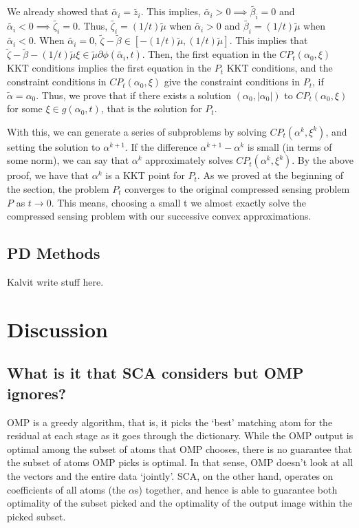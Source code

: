 \documentclass[letterpaper, 10 pt, conference]{article}
\begin{document}
\noindent We already showed that $\tilde{\alpha_i} = \tilde{z_i}$. This implies, $\tilde{\alpha_i} > 0 \implies \tilde{\beta_i} = 0$ and $\tilde{\alpha_i} < 0 \implies \tilde{\zeta_i} = 0$. Thus, $\tilde{\zeta_i} = (1/t)\tilde{\mu}$ when $\tilde{\alpha_i} > 0$ and $\tilde{\beta_i} = (1/t)\tilde{\mu}$ when $\tilde{\alpha_i} < 0$. When $\tilde{\alpha_i} = 0$, $\tilde{\zeta} - \tilde{\beta} \in \left[-(1/t)\tilde{\mu}, (1/t)\tilde{\mu}\right]$. This implies that $\tilde{\zeta} - \tilde{\beta} - (1/t) \tilde{\mu} \xi \in \tilde{\mu} \partial\phi(\tilde{\alpha_i}, t)$. Then, the first equation in the $CP_t(\alpha_0, \xi)$ KKT conditions implies the first equation in the $P_t$ KKT conditions, and the constraint conditions in $CP_t(\alpha_0, \xi)$ give the constraint conditions in $P_t$, if $\tilde{\alpha} = \alpha_0$. Thus, we prove that if there exists a solution $(\alpha_0, |\alpha_0|)$ to $CP_t(\alpha_0, \xi)$ for some $\xi \in g(\alpha_0, t)$, that is the solution for $P_t$.

With this, we can generate a series of subproblems by solving $CP_t(\alpha^k, \xi^k)$, and setting the solution to $\alpha^{k+1}$. If the difference $\alpha^{k+1} - \alpha^{k}$ is small (in terms of some norm), we can say that $\alpha^{k}$ approximately solves $CP_t(\alpha^k, \xi^k)$. By the above proof, we have that $\alpha^k$ is a KKT point for $P_t$. As we proved at the beginning of the section, the problem $P_t$ converges to the original compressed sensing problem $P$ as $t \rightarrow 0$. This means, choosing a small t we almost exactly solve the compressed sensing problem with our successive convex approximations.

\subsection{PD Methods}
{\huge Kalvit write stuff here.}

\section{Discussion}
\subsection{What is it that SCA considers but OMP ignores?}
OMP is a greedy algorithm, that is, it picks the `best' matching atom for the residual at each stage as it goes through the dictionary. While the OMP output is optimal among the subset of atoms that OMP chooses, there is no guarantee that the subset of atoms OMP picks is optimal. In that sense, OMP doesn't look at all the vectors and the entire data `jointly'. SCA, on the other hand, operates on coefficients of all atoms (the $\alpha$s) together, and hence is able to guarantee both optimality of the subset picked and the optimality of the output image within the picked subset.
\end{document}
